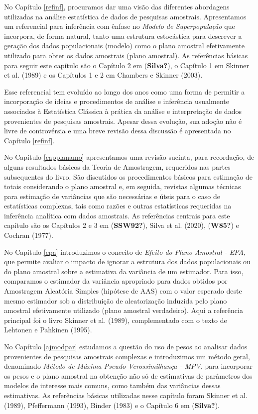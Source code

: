 \documentclass[
  12pt,
  brazilian,
]{book}
\theoremstyle{definition}
\theoremstyle{definition}
\theoremstyle{definition}
\theoremstyle{definition}
\theoremstyle{remark}
\begin{document}
No Capítulo \ref{refinf}, procuramos dar uma visão das diferentes abordagens utilizadas na análise estatística de dados de pesquisas amostrais. Apresentamos um referencial para inferência com ênfase no \emph{Modelo de Superpopulação} que incorpora, de forma natural, tanto uma estrutura estocástica para descrever a geração dos dados populacionais (modelo) como o plano amostral efetivamente utilizado para obter os dados amostrais (plano amostral). As referências básicas para seguir este capítulo são o Capítulo 2 em (\textbf{Silva?}), o Capítulo 1 em Skinner et al. (1989) e os Capítulos 1 e 2 em Chambers e Skinner (2003).

Esse referencial tem evoluído ao longo dos anos como uma forma de permitir a incorporação de ideias e procedimentos de análise e inferência usualmente associados à Estatística Clássica à prática da análise e interpretação de dados provenientes de pesquisas amostrais. Apesar dessa evolução, sua adoção não é livre de controvérsia e uma breve revisão dessa discussão é apresentada no Capítulo \ref{refinf}.

No Capítulo \ref{capplanamo} apresentamos uma revisão sucinta, para recordação, de alguns resultados básicos da Teoria de Amostragem, requeridos nas partes subsequentes do livro. São discutidos os procedimentos básicos para estimação de totais considerando o plano amostral e, em seguida, revistas algumas técnicas para estimação de variâncias que são necessárias e úteis para o caso de estatísticas complexas, tais como razões e outras estatísticas requeridas na inferência analítica com dados amostrais. As referências centrais para este capítulo são os Capítulos 2 e 3 em (\textbf{SSW92?}), Silva et al. (2020), (\textbf{W85?}) e Cochran (1977).

No Capítulo \ref{epa} introduzimos o conceito de \emph{Efeito do Plano Amostral - EPA}, que permite avaliar o impacto de ignorar a estrutura dos dados populacionais ou do plano amostral sobre a estimativa da variância de um estimador. Para isso, comparamos o estimador da variância apropriado para dados obtidos por Amostragem Aleatória Simples (hipótese de AAS) com o valor esperado deste mesmo estimador sob a distribuição de aleatorização induzida pelo plano amostral efetivamente utilizado (plano amostral verdadeiro). Aqui a referência principal foi o livro Skinner et al. (1989), complementado com o texto de Lehtonen e Pahkinen (1995).

No Capítulo \ref{ajmodpar} estudamos a questão do uso de pesos ao analisar dados provenientes de pesquisas amostrais complexas e introduzimos um método geral, denominado \emph{Método de Máxima Pseudo Verossimilhança - MPV}, para incorporar os pesos e o plano amostral na obtenção não só de estimativas de parâmetros dos modelos de interesse mais comuns, como também das variâncias dessas estimativas. As referências básicas utilizadas nesse capítulo foram Skinner et al. (1989), Pfeffermann (1993), Binder (1983) e o Capítulo 6 em (\textbf{Silva?}).
\end{document}
